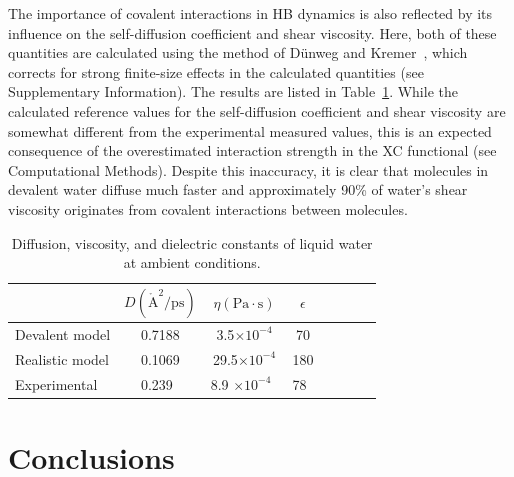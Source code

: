 \documentclass[journal=jacsat,manuscript=article]{achemso}
\newcommand{\Ang}{\ensuremath{\mathring{\text{A}}}}
\begin{document}
The importance of covalent interactions in HB dynamics is also reflected by its influence on the self-diffusion coefficient and shear viscosity. 
Here, both of these quantities are calculated using the method of D\"unweg and Kremer~\cite{dunweg1993molecular}, which corrects for strong finite-size effects in the calculated quantities (see Supplementary Information). The results are listed in Table~\ref{Tab:dfs}. 
While the calculated reference values for the self-diffusion coefficient and shear viscosity are somewhat different from the experimental measured values, this is an expected consequence of the overestimated interaction strength in the XC functional (see Computational Methods). 
Despite this inaccuracy, it is clear that molecules in devalent water diffuse much faster and approximately 90\% of water's shear viscosity originates from covalent interactions between molecules.

\begin{table}
\caption{Diffusion, viscosity, and dielectric constants of liquid water at ambient conditions.}\label{Tab:dfs}
\begin{tabular}{l*{6}{c}r}
\hline
               & $D (\Ang^2/\text{ps})$ & $\eta (\text{Pa}\cdot \text{s})$ & $\epsilon$ \\
\hline
Devalent model                & 0.7188 & 3.5$\times 10^{-4}$ & 70 \\
%
Realistic model              & 0.1069 & 29.5$\times 10^{-4}$ & 180 \\
%
Experimental            & 0.239~\cite{hardy2001isotope}  & 8.9 $\times 10^{-4} $~\cite{harris2004temperature} & 78~\cite{haynes2014crc}
\end{tabular}
\end{table}
 
\section{Conclusions}
\end{document}
